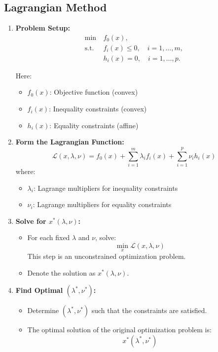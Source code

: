 \subsection{Lagrangian Method}
\begin{process}
    \begin{enumerate}
        \item \textbf{Problem Setup:}
        \[
        \begin{aligned}
            \min \ & f_0(x), \\
            \text{s.t.} \ & f_i(x) \leq 0, \quad i = 1, \dots, m, \\
            & h_i(x) = 0, \quad i = 1, \dots, p.
        \end{aligned}
        \]

        Here:
        \begin{itemize}
            \item \( f_0(x) \): Objective function (convex)
            \item \( f_i(x) \): Inequality constraints (convex)
            \item \( h_i(x) \): Equality constraints (affine)
        \end{itemize}
    
        \item \textbf{Form the Lagrangian Function:}
        \[
        \mathcal{L}(x, \lambda, \nu) = f_0(x) + \sum_{i=1}^m \lambda_i f_i(x) + \sum_{i=1}^p \nu_i h_i(x)
        \]
        where:
        \begin{itemize}
            \item \( \lambda_i \): Lagrange multipliers for inequality constraints
            \item \( \nu_i \): Lagrange multipliers for equality constraints
        \end{itemize}
    
        \item \textbf{Solve for \( x^*(\lambda, \nu) \):}
        \begin{itemize}
            \item For each fixed \( \lambda \) and \( \nu \), solve:
            \[
            \min_x \mathcal{L}(x, \lambda, \nu)
            \]
            This step is an unconstrained optimization problem.
            \item Denote the solution as \( x^*(\lambda, \nu) \).
        \end{itemize}
    
        \item \textbf{Find Optimal \( (\lambda^*, \nu^*) \):}
        \begin{itemize}
            \item Determine \( (\lambda^*, \nu^*) \) such that the constraints are satisfied.
            \item The optimal solution of the original optimization problem is:
            \[
            x^*(\lambda^*, \nu^*)
            \]
        \end{itemize}
    \end{enumerate}
\end{process}


